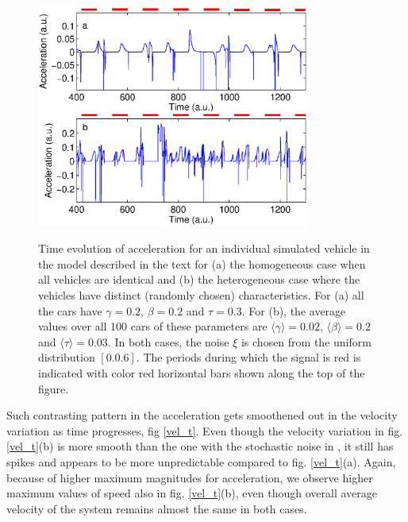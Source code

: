 \documentclass[conference]{IEEEtran}
\begin{document}
\begin{figure}
{    \includegraphics[width=9.0cm, angle=0]{fig2_v2.eps}}
    \caption{Time evolution of acceleration for an individual simulated vehicle in the model described in the text for (a) the homogeneous case when all vehicles are identical and (b) the heterogeneous case where the vehicles have distinct (randomly chosen) characteristics. For (a) all the cars have $\gamma=0.2$, $\beta=0.2$ and $\tau=0.3$. For (b), the average values over all 100 cars of these parameters are $\langle \gamma \rangle =0.02$, $\langle \beta \rangle =0.2$ and $\langle \tau \rangle =0.03$. In both cases, the noise $\xi$ is chosen from the uniform distribution $[0.0.6]$. The periods during which the signal is red is indicated with color red horizontal bars shown along the top of the figure.}

    \label{acc_t}
\end{figure}


Such contrasting pattern in the acceleration gets smoothened out in the velocity variation as time progresses, fig \ref{vel_t}. Even though the velocity variation in fig. \ref{vel_t}(b) is more smooth than the one with the stochastic noise in \cite{Majith2016}, it still has spikes and appears to be more unpredictable compared to fig. \ref{vel_t}(a). Again, because of higher maximum magnitudes for acceleration, we observe higher maximum values of speed also in fig. \ref{vel_t}(b), even though overall average velocity of the system remains almost the same in both cases.
\end{document}
